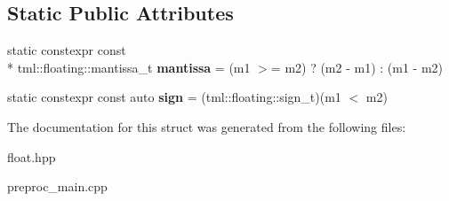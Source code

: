 \subsection*{Static Public Attributes}
\begin{DoxyCompactItemize}
\item 
\hypertarget{structtml_1_1add_3_01tml_1_1floating_1_1number_3_01S__LHS_00_01E__LHS_00_01M__LHS_01_4_00_01tml_4dda86a747ce1a075c2409981eace838_a278fec54695c09da3735dec6309b834e}{static constexpr const \\*
tml\+::floating\+::mantissa\+\_\+t {\bfseries mantissa} = (m1 $>$= m2) ? (m2 -\/ m1) \+: (m1 -\/ m2)}\label{structtml_1_1add_3_01tml_1_1floating_1_1number_3_01S__LHS_00_01E__LHS_00_01M__LHS_01_4_00_01tml_4dda86a747ce1a075c2409981eace838_a278fec54695c09da3735dec6309b834e}

\item 
\hypertarget{structtml_1_1add_3_01tml_1_1floating_1_1number_3_01S__LHS_00_01E__LHS_00_01M__LHS_01_4_00_01tml_4dda86a747ce1a075c2409981eace838_afa6404367ae6e55dad5efec5435e39bd}{static constexpr const auto {\bfseries sign} = (tml\+::floating\+::sign\+\_\+t)(m1 $<$ m2)}\label{structtml_1_1add_3_01tml_1_1floating_1_1number_3_01S__LHS_00_01E__LHS_00_01M__LHS_01_4_00_01tml_4dda86a747ce1a075c2409981eace838_afa6404367ae6e55dad5efec5435e39bd}

\end{DoxyCompactItemize}


The documentation for this struct was generated from the following files\+:\begin{DoxyCompactItemize}
\item 
float.\+hpp\item 
preproc\+\_\+main.\+cpp\end{DoxyCompactItemize}

